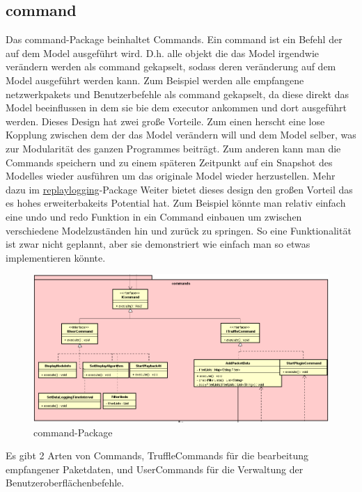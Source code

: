 \subsection{command}
\label{subsec:command}
Das command-Package beinhaltet Commands. Ein command ist ein Befehl der auf
dem Model ausgeführt wird. D.h. alle objekt die das Model irgendwie verändern
werden als command gekapselt, sodass deren veränderung auf dem Model
ausgeführt werden kann. Zum Beispiel werden alle empfangene netzwerk\glspl{paket}
und Benutzerbefehle als command gekapselt, da diese direkt das Model beeinflussen
in dem sie bie dem \gls{executor} ankommen und dort ausgeführt werden.
\newline
\newline
Dieses Design hat zwei große Vorteile. Zum einen herscht eine lose Kopplung zwischen
dem der das Model verändern will und dem Model selber, was zur Modularität des ganzen
Programmes beiträgt. Zum anderen kann man die Commands speichern und zu einem
späteren Zeitpunkt auf ein Snapshot des Modelles wieder ausführen um das originale
Model wieder herzustellen. Mehr dazu im
\hyperref[subsubsec:replaylogging]{replaylogging}-Package Weiter bietet dieses
design den großen Vorteil das es hohes erweiterbakeits Potential hat. Zum Beispiel
könnte man relativ einfach eine undo und redo Funktion in ein Command einbauen um
zwischen verschiedene Modelzuständen hin und zurück zu springen. So eine
Funktionalität ist zwar nicht geplannt, aber sie demonstriert wie einfach man so
etwas implementieren könnte.
\newline
\newline
\begin{figure}[H]
  \centering
  \includegraphics[width=\textwidth]{../diagramimages/commands.png}
  \caption{command-Package}
\end{figure}

Es gibt 2 Arten von Commands, TruffleCommands für die bearbeitung empfangener
Paketdaten, und UserCommands für die Verwaltung der Benutzeroberflächenbefehle.

